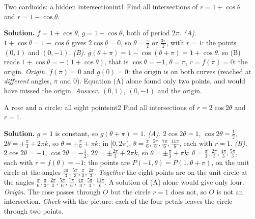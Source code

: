 \documentclass[11pt]{article}
\begin{document}
\begin{exmp}{Two cardioids: a hidden intersection}{int1}
Find all intersections of $r=1+\cos\theta$ and $r=1-\cos\theta$.

\textbf{Solution.} $f=1+\cos\theta$, $g=1-\cos\theta$, both of period $2\pi$. \emph{(A).} $1+\cos\theta=1-\cos\theta$ gives $2\cos\theta=0$, so $\theta=\frac\pi2$ or $\frac{3\pi}2$, with $r=1$: the points $(0,1)$ and $(0,-1)$. \emph{(B).} $g(\theta+\pi)=1-\cos(\theta+\pi)=1+\cos\theta$, so (B) reads $1+\cos\theta=-(1+\cos\theta)$, that is $\cos\theta=-1$, $\theta=\pi$, $r=f(\pi)=0$: the origin. \emph{Origin.} $f(\pi)=0$ and $g(0)=0$: the origin is on both curves (reached at \emph{different} angles, $\pi$ and $0$). Equation (A) alone found only two points, and would have missed the origin. \emph{Answer.} $(0,1)$, $(0,-1)$ and the origin.
\end{exmp}

\begin{exmp}{A rose and a circle: all eight points}{int2}
Find all intersections of $r=2\cos2\theta$ and $r=1$.

\textbf{Solution.} $g=1$ is constant, so $g(\theta+\pi)=1$. \emph{(A).} $2\cos2\theta=1$, $\cos2\theta=\frac12$, $2\theta=\pm\frac\pi3+2\pi k$, so $\theta=\pm\frac\pi6+\pi k$: in $[0,2\pi)$, $\theta=\frac\pi6,\frac{5\pi}6,\frac{7\pi}6,\frac{11\pi}6$, each with $r=1$. \emph{(B).} $2\cos2\theta=-1$, $\cos2\theta=-\frac12$, $2\theta=\pm\frac{2\pi}3+2\pi k$, so $\theta=\pm\frac\pi3+\pi k$: $\theta=\frac\pi3,\frac{2\pi}3,\frac{4\pi}3,\frac{5\pi}3$, each with $r=f(\theta)=-1$; the points are $P(-1,\theta)=P\left(1,\theta+\pi\right)$, on the unit circle at the angles $\frac{4\pi}3,\frac{5\pi}3,\frac\pi3,\frac{2\pi}3$. \emph{Together} the eight points are on the unit circle at the angles $\frac\pi6,\frac\pi3,\frac{2\pi}3,\frac{5\pi}6,\frac{7\pi}6,\frac{4\pi}3,\frac{5\pi}3,\frac{11\pi}6$. A solution of (A) alone would give only four. \emph{Origin.} The rose passes through $O$ but the circle $r=1$ does not, so $O$ is not an intersection. \emph{Check} with the picture: each of the four petals leaves the circle through two points.
\end{exmp}
\end{document}
